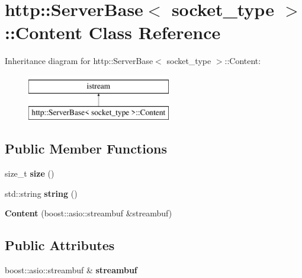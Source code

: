 \hypertarget{classhttp_1_1_server_base_1_1_content}{}\section{http\+:\+:Server\+Base$<$ socket\+\_\+type $>$\+:\+:Content Class Reference}
\label{classhttp_1_1_server_base_1_1_content}
Inheritance diagram for http\+:\+:Server\+Base$<$ socket\+\_\+type $>$\+:\+:Content\+:\begin{figure}[H]
\begin{center}
\leavevmode
\includegraphics[height=2.000000cm]{d8/d54/classhttp_1_1_server_base_1_1_content}
\end{center}
\end{figure}
\subsection*{Public Member Functions}
\begin{DoxyCompactItemize}
\item 
\mbox{\label{classhttp_1_1_server_base_1_1_content_a474902c6c394af6697cf6de4bd245335}} 
size\+\_\+t {\bfseries size} ()
\item 
\mbox{\label{classhttp_1_1_server_base_1_1_content_ac91ebb89641f6aefaf0a75c6c7cd1ddf}} 
std\+::string {\bfseries string} ()
\item 
\mbox{\label{classhttp_1_1_server_base_1_1_content_a0a5b6c2e1ca0a8d03e6fa6078e9781c3}} 
{\bfseries Content} (boost\+::asio\+::streambuf \&streambuf)
\end{DoxyCompactItemize}
\subsection*{Public Attributes}
\begin{DoxyCompactItemize}
\item 
\mbox{\label{classhttp_1_1_server_base_1_1_content_a35706768de83012d6faac164a3653672}} 
boost\+::asio\+::streambuf \& {\bfseries streambuf}
\end{DoxyCompactItemize}
